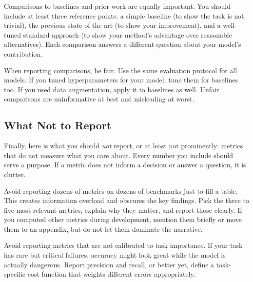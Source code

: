 \vspace{0.3cm}

Comparisons to baselines and prior work are equally important. You should include at least three reference points: a simple baseline (to show the task is not trivial), the previous state of the art (to show your improvement), and a well-tuned standard approach (to show your method's advantage over reasonable alternatives). Each comparison answers a different question about your model's contribution.

\vspace{0.3cm}

When reporting comparisons, be fair. Use the same evaluation protocol for all models. If you tuned hyperparameters for your model, tune them for baselines too. If you used data augmentation, apply it to baselines as well. Unfair comparisons are uninformative at best and misleading at worst.

\vspace{1em}

\subsection{What Not to Report}

Finally, here is what you should \emph{not} report, or at least not prominently: metrics that do not measure what you care about. Every number you include should serve a purpose. If a metric does not inform a decision or answer a question, it is clutter.

\vspace{0.3cm}

Avoid reporting dozens of metrics on dozens of benchmarks just to fill a table. This creates information overload and obscures the key findings. Pick the three to five most relevant metrics, explain why they matter, and report those clearly. If you computed other metrics during development, mention them briefly or move them to an appendix, but do not let them dominate the narrative.

\vspace{0.3cm}

Avoid reporting metrics that are not calibrated to task importance. If your task has rare but critical failures, accuracy might look great while the model is actually dangerous. Report precision and recall, or better yet, define a task-specific cost function that weights different errors appropriately.

\vspace{0.3cm}

